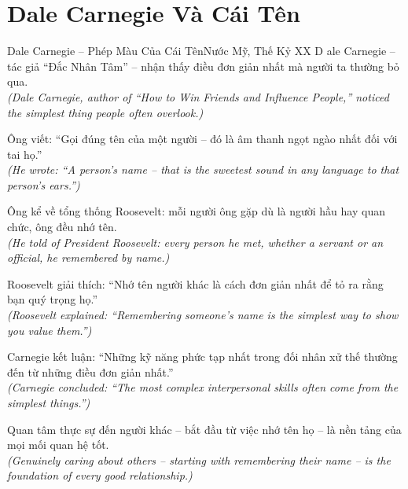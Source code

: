 \section{Dale Carnegie Và Cái Tên}
\begin{truyen}{Dale Carnegie -- Phép Màu Của Cái Tên}{Nước Mỹ, Thế Kỷ XX}
D ale Carnegie -- tác giả ``Đắc Nhân Tâm'' -- nhận thấy điều đơn giản nhất mà người ta thường bỏ qua.\\
\textit{(Dale Carnegie, author of ``How to Win Friends and Influence People,'' noticed the simplest thing people often overlook.)}

Ông viết: ``Gọi đúng tên của một người -- đó là âm thanh ngọt ngào nhất đối với tai họ.''\\
\textit{(He wrote: ``A person's name -- that is the sweetest sound in any language to that person's ears.'')}

Ông kể về tổng thống Roosevelt: mỗi người ông gặp dù là người hầu hay quan chức, ông đều nhớ tên.\\
\textit{(He told of President Roosevelt: every person he met, whether a servant or an official, he remembered by name.)}

Roosevelt giải thích: ``Nhớ tên người khác là cách đơn giản nhất để tỏ ra rằng bạn quý trọng họ.''\\
\textit{(Roosevelt explained: ``Remembering someone's name is the simplest way to show you value them.'')}

Carnegie kết luận: ``Những kỹ năng phức tạp nhất trong đối nhân xử thế thường đến từ những điều đơn giản nhất.''\\
\textit{(Carnegie concluded: ``The most complex interpersonal skills often come from the simplest things.'')}

\end{truyen}
\begin{baihoc}
  Quan tâm thực sự đến người khác -- bắt đầu từ việc nhớ tên họ -- là nền tảng của mọi mối quan hệ tốt.\\
  \textit{(Genuinely caring about others -- starting with remembering their name -- is the foundation of every good relationship.)}
\end{baihoc}

